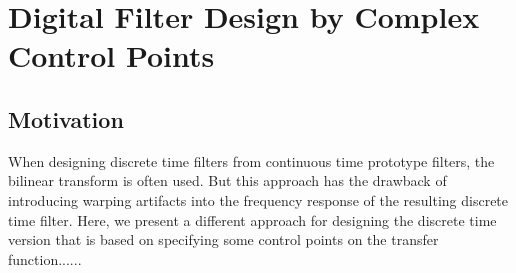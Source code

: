 \section{Digital Filter Design by Complex Control Points}




\subsection{Motivation}
When designing discrete time filters from continuous time prototype filters, the bilinear transform is often used. But this approach has the drawback of introducing warping artifacts into the frequency response of the resulting discrete time filter. Here, we present a different approach for designing the discrete time version that is based on specifying some control points on the transfer function......

